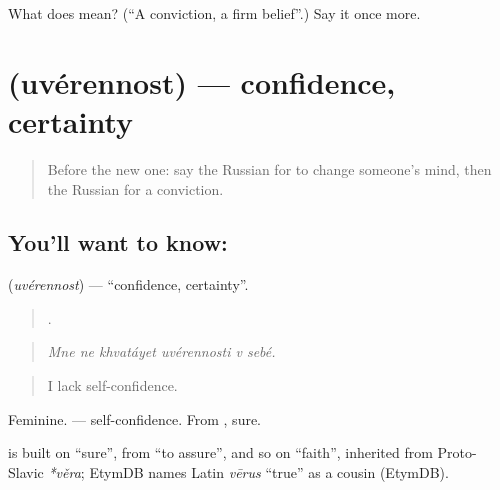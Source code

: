 \begin{tcolorbox}[breakable,colback=teal!4,colframe=teal!35!black,title={Before you move on}]
What does  mean? (\textquotedblleft{}A conviction, a firm belief\textquotedblright{}.) Say it once more.
\end{tcolorbox}
\section[\texorpdfstring{\ru{уверенность} (uvérennost)}{уверенность (uvérennost)}]{ (uvérennost) — confidence, certainty}

\label{lesson:RU-C339-uverennost}



\begin{quote}
Before the new one: say the Russian for to change someone’s mind, then the Russian for a conviction.
\end{quote}

\subsection*{You'll want to know: }
\textbf{} (\emph{uvérennost}) — \textquotedblleft{}confidence, certainty\textquotedblright{}.

\begin{quote}
     .
\end{quote}

\begin{quote}
\emph{Mne ne khvatáyet uvérennosti v sebé.}
\end{quote}

\begin{quote}
I lack self-confidence.
\end{quote}

Feminine. \emph{  } — self-confidence. From \emph{}, sure.

\begin{cousinweb}
\textbf{} is built on \emph{} \textquotedblleft{}sure\textquotedblright{}, from \emph{} \textquotedblleft{}to assure\textquotedblright{}, and so on \emph{} \textquotedblleft{}faith\textquotedblright{}, inherited from Proto-Slavic \emph{*věra}; EtymDB names Latin \emph{vērus} \textquotedblleft{}true\textquotedblright{} as a cousin (EtymDB).
\end{cousinweb}

